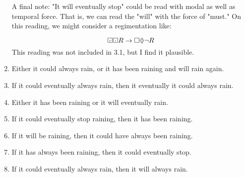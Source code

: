 \documentclass[a4paper, 11pt]{article}                  %
\begin{document}
\begin{enumerate}
{          A final note: "It will eventually stop" could be read with modal as well as temporal force. That is, we can read the "will" with the force of "must." On this reading, we might consider a regimentation like: 

          \[
            \Past \Inevitably R \rightarrow \Box \will \lnot R
          \]
          This reading was not included in 3.1, but I find it plausible. 
    
       }

    \item Either it could always rain, or it has been raining and will rain again.

    \item If it could eventually always rain, then it eventually it could always rain.

    \item Either it has been raining or it will eventually rain.

    \item If it could eventually stop raining, then it has been raining.

    \item If it will be raining, then it could have always been raining.

    \item If it has always been raining, then it could eventually stop.

    \item If it could eventually always rain, then it will always rain.
\end{enumerate}
\end{document}
